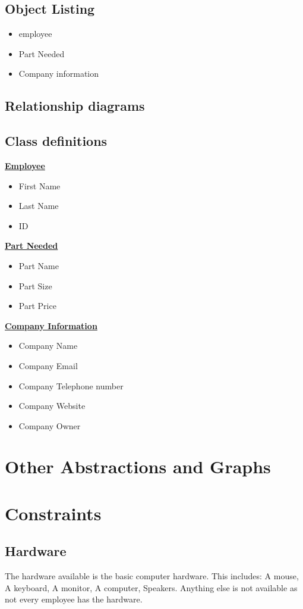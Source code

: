 \subsection{Object Listing}
\begin{itemize}
	\item employee
	\item Part Needed
	\item Company information
\end{itemize}

\subsection{Relationship diagrams}

\subsection{Class definitions}
\bf\underline{Employee}
\begin{itemize}
	\item First Name
	\item Last Name
	\item ID 
\end{itemize}
\bf\underline{Part Needed}
\begin{itemize}
	\item Part Name
	\item Part Size
	\item Part Price
\end{itemize}
\bf\underline{Company Information}
\begin{itemize}
	\item Company Name
	\item Company Email
	\item Company Telephone number
	\item Company Website
	\item Company Owner
\end{itemize}
\section{Other Abstractions and Graphs}

\section{Constraints}

\subsection{Hardware}
The hardware available is the basic computer hardware. This includes: A mouse, A keyboard, A monitor, A computer, Speakers. Anything else is not available as not every employee has the hardware.

